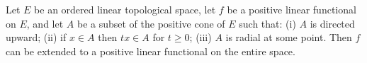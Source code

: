 Let $E$ be an ordered linear topological space, let $f$ be a positive linear functional on $E$, and let $A$ be a subset of the positive cone of $E$ such that: (i) $A$ is directed upward; (ii) if $x \in A$ then $tx \in A$ for $t \geq 0$; (iii) $A$ is radial at some point. Then $f$ can be extended to a positive linear functional on the entire space.
